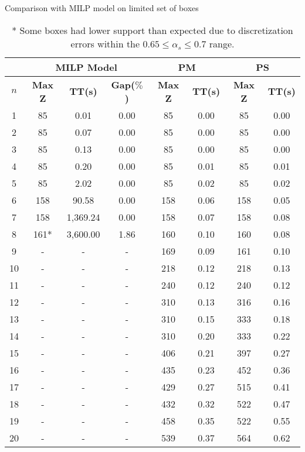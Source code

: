 \begin{table}[htbp]
    \centering
    \caption{Comparison with MILP model on limited set of boxes}
    \begin{tabular}{|c|c|c|c|c|c|c|c|}
    \hline
    & \multicolumn{ 3}{c|}{\textbf{MILP Model}} & \multicolumn{ 2}{c|}{\textbf{PM}} & \multicolumn{ 2}{c|}{\textbf{PS}} \\ \hline
    \textbf{$n$} & \textbf{Max Z} & \textbf{TT(s)} & \textbf{Gap($\%$)} & \textbf{Max Z} & \textbf{TT(s)} & \textbf{Max Z} & \textbf{TT(s)} \\ \hline
    1  & 85   & 0.01     & 0.00 & 85  & 0.00 & 85  & 0.00 \\ 
    2  & 85   & 0.07     & 0.00 & 85  & 0.00 & 85  & 0.00 \\ 
    3  & 85   & 0.13     & 0.00 & 85  & 0.00 & 85  & 0.00 \\ 
    4  & 85   & 0.20     & 0.00 & 85  & 0.01 & 85  & 0.01 \\ 
    5  & 85   & 2.02     & 0.00 & 85  & 0.02 & 85  & 0.02 \\ 
    6  & 158  & 90.58    & 0.00 & 158 & 0.06 & 158 & 0.05 \\ 
    7  & 158  & 1,369.24 & 0.00 & 158 & 0.07 & 158 & 0.08 \\ 
    8  & 161* & 3,600.00 & 1.86 & 160 & 0.10 & 160 & 0.08 \\ \hline
    9  & -    & -        & -    & 169 & 0.09 & 161 & 0.10 \\ 
    10 & -    & -        & -    & 218 & 0.12 & 218 & 0.13 \\ 
    11 & -    & -        & -    & 240 & 0.12 & 240 & 0.12 \\ 
    12 & -    & -        & -    & 310 & 0.13 & 316 & 0.16 \\ 
    13 & -    & -        & -    & 310 & 0.15 & 333 & 0.18 \\ 
    14 & -    & -        & -    & 310 & 0.20 & 333 & 0.22 \\ 
    15 & -    & -        & -    & 406 & 0.21 & 397 & 0.27 \\ 
    16 & -    & -        & -    & 435 & 0.23 & 452 & 0.36 \\ 
    17 & -    & -        & -    & 429 & 0.27 & 515 & 0.41 \\ 
    18 & -    & -        & -    & 432 & 0.32 & 522 & 0.47 \\ 
    19 & -    & -        & -    & 458 & 0.35 & 522 & 0.55 \\ 
    20 & -    & -        & -    & 539 & 0.37 & 564 & 0.62 \\ \hline
    \end{tabular}
    \label{exp:model}
    \caption*{* Some boxes had lower support than expected due to discretization errors within the $ 0.65 \le \alpha_s \le 0.7$ range.}
    \end{table}
